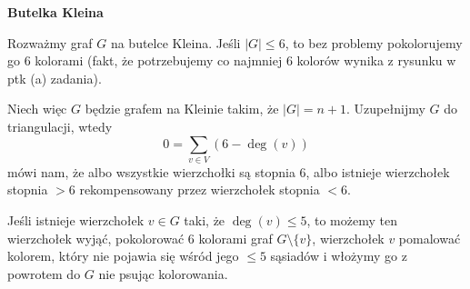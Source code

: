 \begin{enumerate}[label=\textbf{(\alph*)}]
    \textbf{Butelka Kleina} \dotfill

%
%
%
%      
%
%
%


  Rozważmy graf $G$ na butelce Kleina. Jeśli $|G|\leq 6$, to bez problemy pokolorujemy go $6$ kolorami (fakt, że potrzebujemy co najmniej $6$ kolorów wynika z rysunku w ptk (a) zadania). 

  Niech więc $G$ będzie grafem na Kleinie takim, że $|G|=n+1$. Uzupełnijmy $G$ do triangulacji, wtedy
  $$0=\sum_{v\in V}(6-\deg(v))$$
  mówi nam, że albo wszystkie wierzchołki są stopnia $6$, albo istnieje wierzchołek stopnia $>6$ rekompensowany przez wierzchołek stopnia $<6$.

  Jeśli istnieje wierzchołek $v\in G$ taki, że $\deg(v)\leq 5$, to możemy ten wierzchołek wyjąć, pokolorować $6$ kolorami graf $G\setminus \{v\}$, wierzchołek $v$ pomalować kolorem, który nie pojawia się wśród jego $\leq 5$ sąsiadów i włożymy go z powrotem do $G$ nie psując kolorowania.


\end{enumerate}
